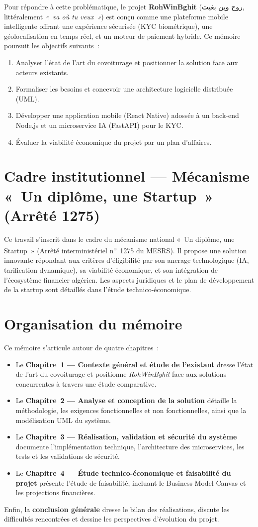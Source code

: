 Pour répondre à cette problématique, le projet \textbf{RohWinBghit} (\textarabic{روح وين بغيت}, littéralement \textit{«~va où tu veux~»}) est conçu comme une plateforme mobile intelligente offrant une expérience sécurisée (KYC biométrique), une géolocalisation en temps réel, et un moteur de paiement hybride. Ce mémoire poursuit les objectifs suivants~:
\begin{enumerate}[leftmargin=1.8em]
  \item Analyser l'état de l'art du covoiturage et positionner la solution face aux acteurs existants.
  \item Formaliser les besoins et concevoir une architecture logicielle distribuée (UML).
  \item Développer une application mobile (React Native) adossée à un back-end Node.js et un microservice IA (FastAPI) pour le KYC.
  \item Évaluer la viabilité économique du projet par un plan d'affaires.
\end{enumerate}

\section*{Cadre institutionnel --- Mécanisme «~Un diplôme, une Startup~» (Arrêté 1275)}

Ce travail s'inscrit dans le cadre du mécanisme national «~Un diplôme, une Startup~» (Arrêté interministériel n\textsuperscript{o}~1275 du MESRS). Il propose une solution innovante répondant aux critères d'éligibilité par son ancrage technologique (IA, tarification dynamique), sa viabilité économique, et son intégration de l'écosystème financier algérien. Les aspects juridiques et le plan de développement de la startup sont détaillés dans l'étude technico-économique.

\section*{Organisation du mémoire}

Ce mémoire s'articule autour de quatre chapitres~:

\begin{itemize}[leftmargin=1.8em]
  \item Le \textbf{Chapitre~1 --- Contexte général et étude de l'existant} dresse l'état de l'art du covoiturage et positionne \textit{RohWinBghit} face aux solutions concurrentes à travers une étude comparative.
  \item Le \textbf{Chapitre~2 --- Analyse et conception de la solution} détaille la méthodologie, les exigences fonctionnelles et non fonctionnelles, ainsi que la modélisation UML du système.
  \item Le \textbf{Chapitre~3 --- Réalisation, validation et sécurité du système} documente l'implémentation technique, l'architecture des microservices, les tests et les validations de sécurité.
  \item Le \textbf{Chapitre~4 --- Étude technico-économique et faisabilité du projet} présente l'étude de faisabilité, incluant le Business Model Canvas et les projections financières.
\end{itemize}

Enfin, la \textbf{conclusion générale} dresse le bilan des réalisations, discute les difficultés rencontrées et dessine les perspectives d'évolution du projet.

